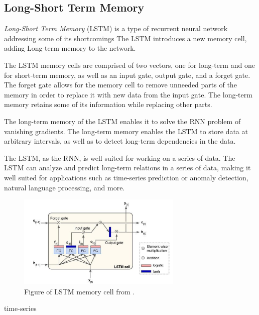 \subsection{Long-Short Term Memory}
\label{section:BT:LSTM}

\textit{Long-Short Term Memory} (LSTM) is a type of recurrent neural network addressing some of its shortcomings
The LSTM introduces a new memory cell, adding Long-term memory to the network.

The LSTM memory cells are comprised of two vectors, one for long-term and one for short-term memory,
as well as an input gate, output gate, and a forget gate.
The forget gate allows for the memory cell to remove unneeded parts of the memory in order to replace it with new data from the input gate.
The long-term memory retains some of its information while replacing other parts.

The long-term memory of the LSTM enables it to solve the RNN problem of vanishing gradients.
The long-term memory enables the LSTM to store data at arbitrary intervals, as well as to detect long-term dependencies in the data.

The LSTM, as the RNN, is well suited for working on a series of data.
The LSTM can analyze and predict long-term relations in a series of data, making it well suited for applications such as time-series prediction or anomaly detection,
natural language processing, and more.

\begin{figure}[h!]
  \centering
  \includegraphics[width=0.7\textwidth]{./sections/BT/figures/lstm_cell_hands_on.png}
  \hfill
  \caption{Figure of LSTM memory cell from \cite[p.~492]{Geron2017}.}
  \label{fig:lstm-memory-cell}
\end{figure}



\cite[p.~492-493]{Geron2017}

time-series
